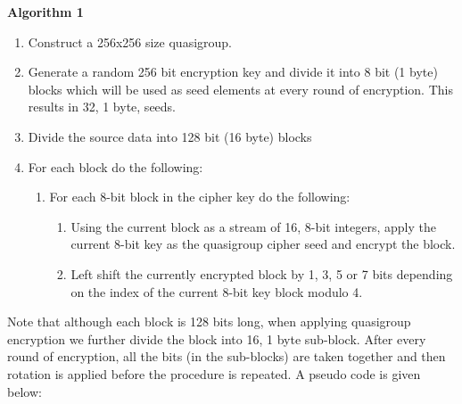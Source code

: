 \documentclass[conference]{IEEEtran}
\begin{document}
\noindent\textbf{Algorithm 1}
\begin{enumerate}
  \item Construct a 256x256 size quasigroup.
  \item Generate a random 256 bit encryption key and divide it into 8 bit (1 byte) blocks which will be used as seed elements at every round of encryption. This results in 32, 1 byte, seeds.
  \item Divide the source data into 128 bit (16 byte) blocks
  \item For each block do the following:
  \begin{enumerate}
    \item For each 8-bit block in the cipher key do the following:
    \begin{enumerate}
      \item Using the current block as a stream of 16, 8-bit integers, apply the current 8-bit key as the quasigroup cipher seed and encrypt the block.
      \item Left shift the currently encrypted block by 1, 3, 5 or 7 bits depending on the index of the current 8-bit key block modulo 4.
    \end{enumerate}
  \end{enumerate}
\end{enumerate}

Note that although each block is 128 bits long, when applying quasigroup encryption we further divide the block into 16, 1 byte sub-block. After every round of encryption, all the bits (in the sub-blocks) are taken together and then rotation is applied before the procedure is repeated. A pseudo code is given below:\\
\end{document}
